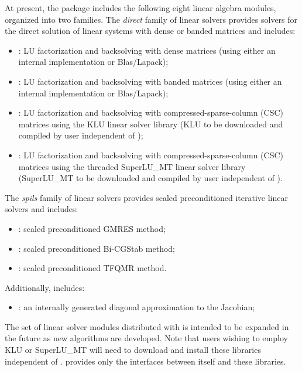 At present, the package includes the following eight {\cvodes} linear algebra
modules, organized into two families. The {\em direct} family of linear
solvers provides solvers for the direct solution of linear systems with
dense or banded matrices and includes:
\begin{itemize} 
\item {\cvdense}: LU factorization and backsolving with dense matrices
  (using either an internal implementation or Blas/Lapack); 
\item {\cvband}: LU factorization and backsolving with banded matrices
  (using either an internal implementation or Blas/Lapack); 
\item {\cvklu}: LU factorization and backsolving with
  compressed-sparse-column (CSC) matrices using the KLU linear solver
  library \cite{DaPa:10,KLU_site} (KLU to be downloaded and compiled by user independent 
  of {\cvodes});
\item {\cvsuperlumt}: LU factorization and backsolving with
  compressed-sparse-column (CSC) matrices using the threaded
  SuperLU\_MT linear solver library \cite{Li:05,DGL:99,SuperLUMT_site} 
  (SuperLU\_MT to be downloaded and compiled by user independent 
  of {\cvodes}).
\end{itemize}
The {\em spils} family of linear solvers provides scaled preconditioned
iterative linear solvers and includes:
\begin{itemize} 
\item {\cvspgmr}: scaled preconditioned GMRES method;
\item {\cvspbcg}: scaled preconditioned Bi-CGStab method;
\item {\cvsptfqmr}: scaled preconditioned TFQMR method.
\end{itemize}
Additionally, {\cvodes} includes:
\begin{itemize}
\item {\cvdiag}: an internally generated diagonal approximation to the 
  Jacobian; 
\end{itemize}
The set of linear solver modules distributed with {\cvodes} is intended to be expanded in the
future as new algorithms are developed.
Note that users wishing to employ KLU or 
SuperLU\_MT will need to download and install these libraries independent of {\sundials}.
{\sundials} provides only the interfaces between itself and these libraries.

